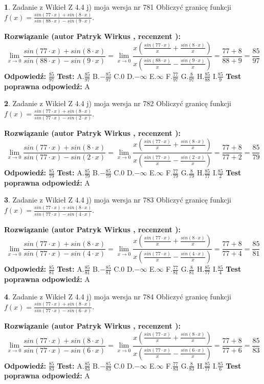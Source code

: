 \documentclass[12pt, a4paper]{article}
\theoremstyle{definition} %
\newtheorem{zad}{}
\newcommand{\zadStart}[1]{\begin{zad}#1\newline}
\newcommand{\zadStop}{\end{zad}}
\newcommand{\rozwStart}[2]{\noindent \textbf{Rozwiązanie (autor #1 , recenzent #2): }\newline}
\newcommand{\rozwStop}{\newline}
\newcommand{\odpStart}{\noindent \textbf{Odpowiedź:}\newline}
\newcommand{\odpStop}{\newline}
\newcommand{\testStart}{\noindent \textbf{Test:}\newline}
\newcommand{\testStop}{\newline}
\newcommand{\kluczStart}{\noindent \textbf{Test poprawna odpowiedź:}\newline}
\newcommand{\kluczStop}{\newline}
\begin{document}
\zadStart{Zadanie z Wikieł Z 4.4 j) moja wersja nr 781}
Obliczyć granicę funkcji $f(x)=\frac{sin(77\cdot x) +sin(8\cdot x)}{sin(88\cdot x) -sin(9\cdot x)}$.
\zadStop
\rozwStart{Patryk Wirkus}{}
$$\lim\limits_{x\to 0}\frac{sin(77\cdot x) +sin(8\cdot x)}{sin(88\cdot x) -sin(9\cdot x)}=\lim\limits_{x\to 0}\frac{x(\frac{sin(77\cdot x)}{x}+\frac{sin(8\cdot x)}{x})}{x(\frac{sin(88\cdot x)}{x}-\frac{sin(9\cdot x)}{x})}=\frac{77+8}{88+9} = \frac{85}{97}$$
\rozwStop
\odpStart
$\frac{85}{97}$
\odpStop
\testStart
A.$\frac{85}{97}$
B.$-\frac{85}{97}$
C.$0$
D.$-\infty$
E.$\infty$
F.$\frac{77}{97}$
G.$\frac{8}{97}$
H.$\frac{85}{88}$
I.$\frac{85}{9}$
\testStop
\kluczStart
A
\kluczStop



\zadStart{Zadanie z Wikieł Z 4.4 j) moja wersja nr 782}
Obliczyć granicę funkcji $f(x)=\frac{sin(77\cdot x) +sin(8\cdot x)}{sin(77\cdot x) -sin(2\cdot x)}$.
\zadStop
\rozwStart{Patryk Wirkus}{}
$$\lim\limits_{x\to 0}\frac{sin(77\cdot x) +sin(8\cdot x)}{sin(77\cdot x) -sin(2\cdot x)}=\lim\limits_{x\to 0}\frac{x(\frac{sin(77\cdot x)}{x}+\frac{sin(8\cdot x)}{x})}{x(\frac{sin(77\cdot x)}{x}-\frac{sin(2\cdot x)}{x})}=\frac{77+8}{77+2} = \frac{85}{79}$$
\rozwStop
\odpStart
$\frac{85}{79}$
\odpStop
\testStart
A.$\frac{85}{79}$
B.$-\frac{85}{79}$
C.$0$
D.$-\infty$
E.$\infty$
F.$\frac{77}{79}$
G.$\frac{8}{79}$
H.$\frac{85}{77}$
I.$\frac{85}{2}$
\testStop
\kluczStart
A
\kluczStop



\zadStart{Zadanie z Wikieł Z 4.4 j) moja wersja nr 783}
Obliczyć granicę funkcji $f(x)=\frac{sin(77\cdot x) +sin(8\cdot x)}{sin(77\cdot x) -sin(4\cdot x)}$.
\zadStop
\rozwStart{Patryk Wirkus}{}
$$\lim\limits_{x\to 0}\frac{sin(77\cdot x) +sin(8\cdot x)}{sin(77\cdot x) -sin(4\cdot x)}=\lim\limits_{x\to 0}\frac{x(\frac{sin(77\cdot x)}{x}+\frac{sin(8\cdot x)}{x})}{x(\frac{sin(77\cdot x)}{x}-\frac{sin(4\cdot x)}{x})}=\frac{77+8}{77+4} = \frac{85}{81}$$
\rozwStop
\odpStart
$\frac{85}{81}$
\odpStop
\testStart
A.$\frac{85}{81}$
B.$-\frac{85}{81}$
C.$0$
D.$-\infty$
E.$\infty$
F.$\frac{77}{81}$
G.$\frac{8}{81}$
H.$\frac{85}{77}$
I.$\frac{85}{4}$
\testStop
\kluczStart
A
\kluczStop



\zadStart{Zadanie z Wikieł Z 4.4 j) moja wersja nr 784}
Obliczyć granicę funkcji $f(x)=\frac{sin(77\cdot x) +sin(8\cdot x)}{sin(77\cdot x) -sin(6\cdot x)}$.
\zadStop
\rozwStart{Patryk Wirkus}{}
$$\lim\limits_{x\to 0}\frac{sin(77\cdot x) +sin(8\cdot x)}{sin(77\cdot x) -sin(6\cdot x)}=\lim\limits_{x\to 0}\frac{x(\frac{sin(77\cdot x)}{x}+\frac{sin(8\cdot x)}{x})}{x(\frac{sin(77\cdot x)}{x}-\frac{sin(6\cdot x)}{x})}=\frac{77+8}{77+6} = \frac{85}{83}$$
\rozwStop
\odpStart
$\frac{85}{83}$
\odpStop
\testStart
A.$\frac{85}{83}$
B.$-\frac{85}{83}$
C.$0$
D.$-\infty$
E.$\infty$
F.$\frac{77}{83}$
G.$\frac{8}{83}$
H.$\frac{85}{77}$
I.$\frac{85}{6}$
\testStop
\kluczStart
A
\kluczStop
\end{document}

